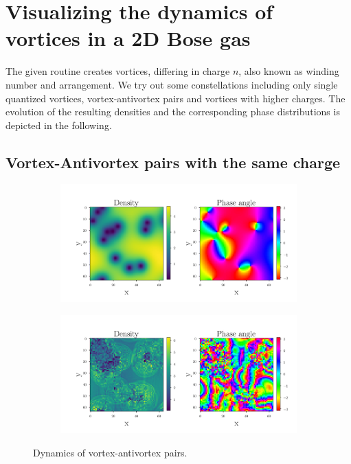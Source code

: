 \section{Visualizing the dynamics of vortices in a 2D Bose gas}

The given routine creates vortices, differing in charge $n$, also known as winding number and arrangement. We try out some constellations including only single quantized vortices, vortex-antivortex pairs and vortices with higher charges. The evolution of the resulting densities and the corresponding phase distributions is depicted in the following. 

\subsection{Vortex-Antivortex pairs with the same charge}
 \begin{figure}[H]
 \centering
 \begin{subfigure}{0.49\textwidth} 
 	\includegraphics[width= \textwidth]{figures/vortex_1_0}
 \end{subfigure} 
 \begin{subfigure}{0.49\textwidth} 
 	\includegraphics[width=\textwidth]{figures/vortex_1_50}
 \end{subfigure}
 \caption{Dynamics of vortex-antivortex pairs.}	
 \end{figure}


